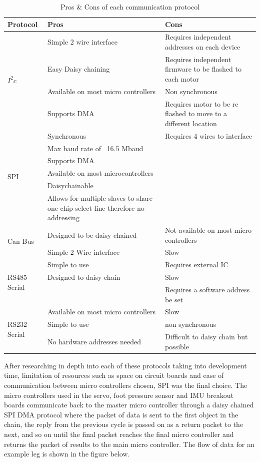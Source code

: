     \begin{table}[H]
        \centering
        \begin{tabular}{|p{2cm}|p{6cm}|p{6cm}|}
    \hline
      Protocol   & Pros & Cons \\
    \hline
         \multirow{4}{*}{${I^2c}$} & Simple 2 wire interface & Requires independent addresses on each device \\
         & Easy Daisy chaining & Requires independent firmware to be flashed to each motor \\
         & Available on most micro controllers & Non synchronous \\
         & Supports DMA & Requires motor to be re flashed to move to a different location \\
         \hline
         \multirow{6}{*}{SPI} & Synchronous & Requires 4 wires to interface \\
         & Max baud rate of ~16.5 Mbaud &   \\
         & Supports DMA &  \\
         & Available on most microcontrollers & \\
         & Daisychainable & \\
         & Allows for multiple slaves to share one chip select line therefore no addressing & \\
         \hline
         \multirow{2}{*}{Can Bus} & Designed to be daisy chained  & Not available on most micro controllers \\
         & Simple 2 Wire interface & Slow  \\
         \hline
        \multirow{3}{*}{RS485 Serial}& Simple to use & Requires external IC\\
         &Designed to daisy chain & Slow \\
         & & Requires a software address be set\\
         \hline
         \multirow{3}{*}{RS232 Serial}& Available on most micro controllers & Slow\\
         & Simple to use & non synchronous \\
         & No hardware addresses needed & Difficult to daisy chain but possible\\
         
    \hline
    \end{tabular}
        \caption{Pros \& Cons of each communication protocol}
        \label{tab:my_label}
    \end{table}
   After researching in depth into each of these protocols taking into development time, limitation of resources such as space on circuit boards and ease of communication between micro controllers chosen, SPI was the final choice. The micro controllers used in the servo, foot pressure sensor and IMU breakout boards communicate back to the master micro controller through a daisy chained SPI DMA protocol where the packet of data is sent to the first object in the chain, the reply from the previous cycle is passed on as a return packet to the next, and so on until the final packet reaches the final micro controller and returns the packet of results to the main micro controller. The flow of data for an example leg is shown in the figure below.
